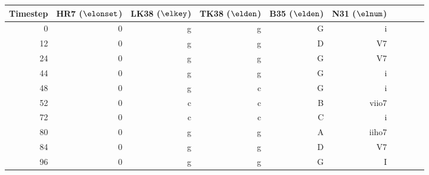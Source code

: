\begin{tabular}{r|rrrrrrrrr}
Timestep & HR7 ($\elonset$) & LK38 ($\elkey$) & TK38 ($\elden$) & B35 ($\elden$)  & N31 ($\elnum$)  \\ \hline
0        & 0   & g    & g    & G     & i     \\
12       & 0   & g    & g    & D     & V7    \\
24       & 0   & g    & g    & G     & V7    \\
44       & 0   & g    & g    & G     & i     \\ \hline
48       & 0   & g    & c    & G     & i     \\
52       & 0   & c    & c    & B     & viio7 \\
72       & 0   & c    & c    & C     & i     \\
80       & 0   & g    & g    & A     & iiho7 \\
84       & 0   & g    & g    & D     & V7    \\
96       & 0   & g    & g    & G     & I     \\
\end{tabular}
